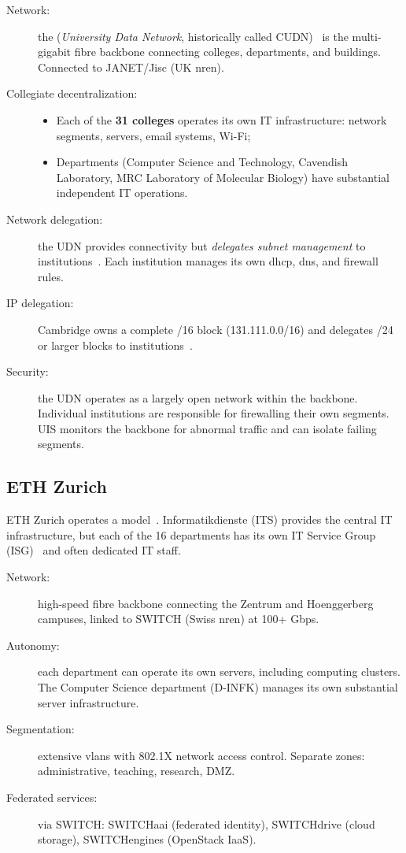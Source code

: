 \begin{description}
    \item[Network:] the  (\emph{University Data
    Network}, historically called CUDN)~\cite{cambridge-udn} is the
    multi-gigabit fibre backbone connecting colleges, departments, and
    buildings. Connected to JANET/Jisc (UK \gls{nren}).
    \item[Collegiate decentralization:]
    \begin{itemize}[nosep]
        \item Each of the \textbf{31 colleges} operates its own IT
        infrastructure: network segments, servers, email systems, Wi-Fi;
        \item Departments (Computer Science and Technology, Cavendish
        Laboratory, MRC Laboratory of Molecular Biology) have substantial
        independent IT operations.
    \end{itemize}
    \item[Network delegation:] the UDN provides connectivity but
    \emph{delegates subnet management} to
    institutions~\cite{cambridge-connections}. Each institution manages
    its own \gls{dhcp}, \gls{dns}, and firewall rules.
    \item[IP delegation:] Cambridge owns a complete /16 block
    (131.111.0.0/16) and delegates /24 or larger blocks to
    institutions~\cite{cambridge-ip}.
    \item[Security:] the UDN operates as a largely open network within
    the backbone. Individual institutions are responsible for firewalling
    their own segments. UIS monitors the backbone for abnormal traffic
    and can isolate failing segments.
\end{description}

\subsection{ETH Zurich}

ETH Zurich operates a 
model~\cite{eth-departments}.
Informatikdienste (ITS) provides the central IT infrastructure, but each
of the 16 departments has its own IT Service Group
(ISG)~\cite{eth-isg-infk} and often dedicated IT staff.

\begin{description}
    \item[Network:] high-speed fibre backbone connecting the Zentrum and
    Hoenggerberg campuses, linked to SWITCH (Swiss \gls{nren}) at 100+ Gbps.
    \item[Autonomy:] each department can operate its own servers,
    including computing clusters. The Computer Science department (D-INFK)
    manages its own substantial server infrastructure.
    \item[Segmentation:] extensive \gls{vlan}s with 802.1X network access
    control. Separate zones: administrative, teaching, research, DMZ.
    \item[Federated services:] via SWITCH: SWITCHaai (federated identity),
    SWITCHdrive (cloud storage), SWITCHengines (OpenStack IaaS).
\end{description}

